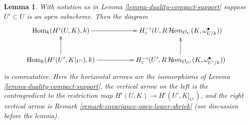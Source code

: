 \documentclass{stacks-project}
\theoremstyle{plain}
\newtheorem{lemma}[subsection]{Lemma}
\theoremstyle{definition}
\theoremstyle{remark}
\numberwithin{equation}{subsection}
\def\Hom{\mathop{\mathrm{Hom}}\nolimits}
\def\SheafHom{\mathop{\mathcal{H}\!\mathit{om}}\nolimits}
\begin{document}
\begin{lemma}
\label{lemma-duality-compact-support-restrict-open}
With notation as in Lemma \ref{lemma-duality-compact-support}
suppose $U' \subset U$ is an open subscheme. Then the diagram
$$
\xymatrix{
\Hom_k(H^i(U, K), k) \ar[rr] & &
H^{-i}_c(U, R\SheafHom_{\mathcal{O}_U}(K, \omega_{U/k}^\bullet)) \\
\Hom_k(H^i(U', K|_{U'}), k) \ar[rr] \ar[u] & &
H^{-i}_c(U', R\SheafHom_{\mathcal{O}_{U'}}(K, \omega_{U'/k}^\bullet)) \ar[u]
}
$$
is commutative. Here the horizontal arrows are the isomorphisms of
Lemma \ref{lemma-duality-compact-support}, the vertical arrow on the
left is the contragredient to the restriction map
$H^i(U, K) \to H^i(U', K|_{U'})$, and the right vertical arrow
is Remark \ref{remark-covariance-open-lower-shriek} (see discussion
before the lemma).
\end{lemma}
\end{document}
